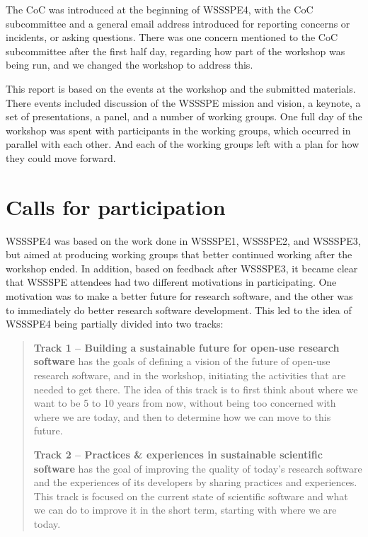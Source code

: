 \documentclass[11pt, oneside]{amsart}
\begin{document}
The CoC was introduced at the beginning of WSSSPE4, with the CoC subcommittee
and a general email address introduced for reporting concerns or incidents, or
asking questions.  There was one concern mentioned to the CoC subcommittee
after the first half day,
regarding how part of the workshop was being run, and we changed the workshop
to address this.

This report is based on the events at the workshop and the submitted materials.
There events included discussion of the WSSSPE mission and vision, a keynote,
a set of presentations, a panel, and a number of working groups.  One full day of the
workshop was spent with participants in the working groups, which occurred in parallel
with each other.  And each of the working groups left with a plan for how they could move
forward.

\section{Calls for participation} \label{sec:preworkshop}

WSSSPE4 was based on the work done in WSSSPE1, WSSSPE2, and WSSSPE3, but aimed
at producing working groups that better continued working after the workshop ended.
In addition, based on feedback after WSSSPE3, it became clear that WSSSPE attendees
had two different motivations in participating.  One motivation was to make a better future
for research software, and the other was to immediately do better research software development.
This led to the idea of WSSSPE4 being partially divided into two tracks:

\begin{quote}
    \textbf{Track 1 -- Building a sustainable future for open-use research
    software} has the goals of defining a vision of the future of open-use
    research software, and in the workshop, initiating the activities that are
    needed to get there. The idea of this track is to first think about where
    we want to be 5 to 10 years from now, without being too concerned with
    where we are today, and then to determine how we can move to this future.

    \noindent \textbf{Track 2 -- Practices \& experiences in sustainable scientific software}
    has the goal of improving the quality of today's research software and the
    experiences of its developers by sharing practices and experiences.
    This track is focused on the current state of scientific software and what
    we can do to improve it in the short term, starting with where we are today.
\end{quote}
\end{document}

